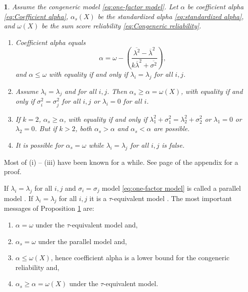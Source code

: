 \documentclass{article}
\makeatletter
\theoremstyle{plain}
\theoremstyle{plain}
\theoremstyle{definition}
\theoremstyle{remark}
\theoremstyle{definition}
\theoremstyle{plain}
\theoremstyle{plain}
\newtheorem{prop}[thm]{\protect\propositionname}
\theoremstyle{definition}
\newenvironment{proof}[1][\protect\proofname]{\par
	\normalfont\topsep6\p@\@plus6\p@\relax
	\trivlist
	\itemindent\parindent
	\item[\hskip\labelsep\scshape #1]\ignorespaces
}{%
	\endtrivlist\@endpefalse
}
\providecommand{\proofname}{Proof}
\providecommand{\propositionname}{Proposition}
\makeatother
\begin{document}
\begin{prop}
\label{prop:Reliabilities.}Assume the congeneric model \eqref{eq:one-factor model}. Let $\alpha$ be coefficient alpha \eqref{eq:Coefficient alpha}, $\alpha_{s}(X)$ be the standardized alpha \eqref{eq:standardized alpha}, and  $\omega(X)$ be the sum score reliability \eqref{eq:Congeneric reliability}. 
\begin{enumerate}[label=(\roman*)]
\item Coefficient alpha equals $$\alpha=\omega-\left(\frac{\overline{\lambda^{2}}-\overline{\lambda}^{2}}{k\overline{\lambda}^{2}+\overline{\sigma^{2}}}\right),$$
and $\alpha\leq\omega$ with equality
if and only if $\lambda_{i}=\lambda_{j}$ for all $i,j$.
\item Assume $\lambda_{i}=\lambda_{j}$ and for all $i,j$. Then $\alpha_s \geq \alpha = \omega(X)$, with equality if and only if $\sigma_{i}^{2}=\sigma_{j}^{2}$ for all $i,j$ or $\lambda_i = 0$ for all $i$.
\item If $k=2$, $\alpha_s\geq\alpha$, with equality if and only if $\lambda_{1}^{2}+\sigma_{1}^{2}=\lambda_{2}^{2}+\sigma_{2}^{2}$ or $\lambda_1 = 0$ or $\lambda_2 = 0$. But if $k>2$, both $\alpha_s>\alpha$
and $\alpha_s<\alpha$ are possible.
\item It is possible for $\alpha_s = \omega$ while $\lambda_i = \lambda_j$ for all $i,j$ is false.
\end{enumerate}
\end{prop}
\begin{proof}
Most of (i) -- (iii) have been known for a while. See page \pageref{proof:Reliabilities.} of the appendix for a proof.
\end{proof}

If $\lambda_{i}=\lambda_{j}$ for all $i,j$ and $\sigma_{i}=\sigma_{j}$
model \eqref{eq:one-factor model} is called a parallel model \citep[][section 2.13]{Lord1968-ax}. If $\lambda_{i}=\lambda_{j}$
for all $i,j$ it is a $\tau$-equivalent model \citep[][section 2.13]{Lord1968-ax}. The most important messages of Proposition \ref{prop:Reliabilities.} are:

\begin{enumerate}[label=(\alph*)]
\item $\alpha = \omega$ under the $\tau$-equivalent model and,
\item $\alpha_s = \omega$ under the parallel model and,
\item $\alpha \leq \omega(X)$, hence coefficient alpha is a lower bound for the congeneric reliability and,
\item $\alpha_s \geq \alpha = \omega(X)$ under the $\tau$-equivalent model.
\end{enumerate}
\end{document}
